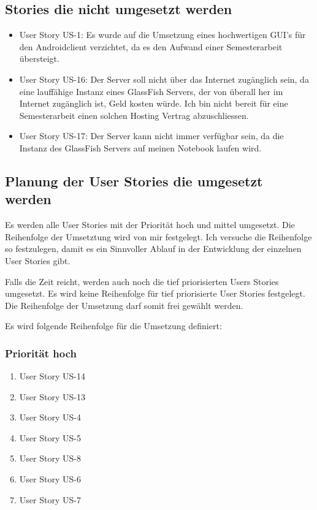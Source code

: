 \documentclass[listof=totocnumbered, bibliography=totocnumbered]{scrreprt}
\begin{document}
  \subsection{Stories die nicht umgesetzt werden}
  
  \begin{itemize}
    \item User Story US-1: Es wurde auf die Umsetzung eines hochwertigen
    \ac{GUI}'s für den Androidclient verzichtet, da es den Aufwand einer
    Semesterarbeit übersteigt.
    \item User Story US-16: Der Server soll nicht über das Internet zugänglich
    sein, da eine lauffähige Instanz eines GlassFish Servers, der von überall
    her im Internet zugänglich ist, Geld kosten würde. Ich bin nicht bereit für
    eine Semesterarbeit einen solchen Hosting Vertrag abzuschliessen.
    \item User Story US-17: Der Server kann nicht immer verfügbar sein, da die
    Instanz des GlassFish Servers auf meinen Notebook laufen wird.
  \end{itemize}
  
  \subsection{Planung der User Stories die umgesetzt werden}
  
  Es werden alle User Stories mit der Priorität hoch und mittel umgesetzt. Die
  Reihenfolge der Umsetztung wird von mir festgelegt. Ich versuche die
  Reihenfolge so festzulegen, damit es ein Sinnvoller Ablauf in der Entwicklung
  der einzelnen User Stories gibt.
  
  Falls die Zeit reicht, werden auch noch die tief priorisierten Users Stories
  umgesetzt. Es wird keine Reihenfolge für tief priorisierte User Stories
  festgelegt. Die Reihenfolge der Umsetzung darf somit frei gewählt werden.\newline
  
  Es wird folgende Reihenfolge für die Umsetzung definiert:

  \subsubsection{Priorität hoch}
  
  
  \begin{enumerate}
    \item User Story US-14
    \item User Story US-13
    \item User Story US-4
    \item User Story US-5
    \item User Story US-8
    \item User Story US-6
    \item User Story US-7
    \setcounter{userStoriesZaehler}{\value{enumi}}
  \end{enumerate}
  
\end{document}
